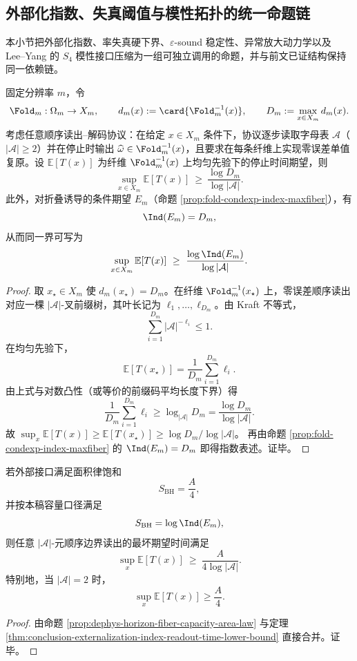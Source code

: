 \subsection{外部化指数、失真阈值与模性拓扑的统一命题链}\label{subsec:conclusion-externalization-distortion-modularity-topology}
本小节把外部化指数、率失真硬下界、\(\varepsilon\)-sound 稳定性、异常放大动力学以及 Lee--Yang 的 \(S_4\) 模性接口压缩为一组可独立调用的命题，并与前文已证结构保持同一依赖链。

\begin{theorem}[外部化指数控制的最坏读出时间下界]\label{thm:conclusion-externalization-index-readout-time-lower-bound}
固定分辨率 \(m\)，令
\[
\Fold_m:\Omega_m\to X_m,\qquad
d_m(x):=\card{\Fold_m^{-1}(x)},\qquad
D_m:=\max_{x\in X_m}d_m(x).
\]
考虑任意顺序读出--解码协议：在给定 \(x\in X_m\) 条件下，协议逐步读取字母表 \(\mathcal A\)（\(|\mathcal A|\ge 2\)）并在停止时输出 \(\widehat\omega\in \Fold_m^{-1}(x)\)，且要求在每条纤维上实现零误差单值复原。设 \(\mathbb E[T(x)]\) 为纤维 \(\Fold_m^{-1}(x)\) 上均匀先验下的停止时间期望，则
\[
\sup_{x\in X_m}\mathbb E[T(x)]
\ \ge\
\frac{\log D_m}{\log|\mathcal A|}.
\]
此外，对折叠诱导的条件期望 \(E_m\)（命题 \ref{prop:fold-condexp-index-maxfiber}），有
\[
\Ind(E_m)=D_m,
\]
从而同一界可写为
\[
\sup_{x\in X_m}\mathbb E[T(x)]
\ \ge\
\frac{\log \Ind(E_m)}{\log|\mathcal A|}.
\]
\end{theorem}
\begin{proof}
取 \(x_\star\in X_m\) 使 \(d_m(x_\star)=D_m\)。在纤维 \(\Fold_m^{-1}(x_\star)\) 上，零误差顺序读出对应一棵 \(|\mathcal A|\)-叉前缀树，其叶长记为 \(\ell_1,\dots,\ell_{D_m}\)。由 Kraft 不等式，
\[
\sum_{i=1}^{D_m}|\mathcal A|^{-\ell_i}\le 1.
\]
在均匀先验下，
\[
\mathbb E[T(x_\star)]=\frac1{D_m}\sum_{i=1}^{D_m}\ell_i.
\]
由上式与对数凸性（或等价的前缀码平均长度下界）得
\[
\frac1{D_m}\sum_{i=1}^{D_m}\ell_i\ge \log_{|\mathcal A|}D_m
=\frac{\log D_m}{\log|\mathcal A|}.
\]
故 \(\sup_x\mathbb E[T(x)]\ge \mathbb E[T(x_\star)]\ge \log D_m/\log|\mathcal A|\)。
再由命题 \ref{prop:fold-condexp-index-maxfiber} 的 \(\Ind(E_m)=D_m\) 即得指数表述。证毕。
\end{proof}

\begin{corollary}[面积律饱和下的边界读出时间下界]\label{cor:conclusion-area-law-page-time-lower-bound}
若外部接口满足面积律饱和
\[
S_{\mathrm{BH}}=\frac{A}{4},
\]
并按本稿容量口径满足
\[
S_{\mathrm{BH}}=\log\Ind(E_m),
\]
则任意 \(|\mathcal A|\)-元顺序边界读出的最坏期望时间满足
\[
\sup_{x}\mathbb E[T(x)]
\ \ge\
\frac{A}{4\log|\mathcal A|}.
\]
特别地，当 \(|\mathcal A|=2\) 时，
\[
\sup_x\mathbb E[T(x)]\ge \frac{A}{4}.
\]
\end{corollary}
\begin{proof}
由命题 \ref{prop:dephys-horizon-fiber-capacity-area-law} 与定理 \ref{thm:conclusion-externalization-index-readout-time-lower-bound} 直接合并。证毕。
\end{proof}

